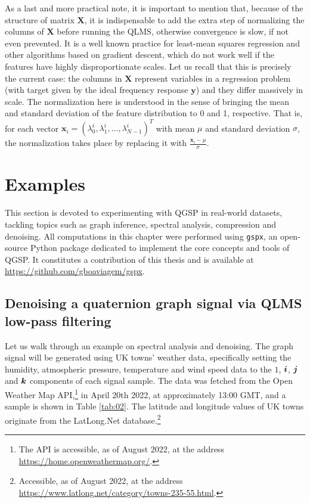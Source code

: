 As a last and more practical note, it is important to mention that, because of the structure of matrix $\mathbf{X}$, it is indispensable to add the extra step of normalizing the columns of $\mathbf{X}$ before running the QLMS, otherwise convergence is slow, if not even prevented. It is a well known practice for least-mean squares regression and other algorithms based on gradient descent, which do not work well if the features have highly disproportionate scales. Let us recall that this is precisely the current case: the columns in $\mathbf{X}$ represent variables in a regression problem (with target given by the ideal frequency response $\mathbf{y}$) and they differ massively in scale. The normalization here is understood in the sense of bringing the mean and standard deviation of the feature distribution to 0 and 1, respective. That is, for each vector $\mathbf{x}_i = (\lambda^i_0, \lambda^i_1, \dots, \lambda^i_{N-1})^T$ with mean $\mu$ and standard deviation $\sigma$, the normalization takes place by replacing it with $\frac{\mathbf{x}_i - \mu}{\sigma}$.

\section{Examples}

This section is devoted to experimenting with QGSP in real-world datasets, tackling topics such as graph inference, spectral analysis, compression and denoising. All computations in this chapter were performed using \texttt{gspx}, an open-source Python package dedicated to implement the core concepts and tools of QGSP. It constitutes a contribution of this thesis and is available at \url{https://github.com/gboaviagem/gspx}.

\subsection{Denoising a quaternion graph signal via QLMS low-pass filtering}
\label{subsec:denoising}

Let us walk through an example on spectral analysis and denoising. The graph signal will be generated using UK towns' weather data, specifically setting the humidity, atmospheric pressure, temperature and wind speed data to the $1$, $\boldsymbol{i}$, $\boldsymbol{j}$ and $\boldsymbol{k}$ components of each signal sample. The data was fetched from the Open Weather Map API,\footnote{The API is accessible, as of August 2022, at the address \url{https://home.openweathermap.org/}.} in April 20th 2022, at approximately 13:00 GMT, and a sample is shown in Table \ref{tab:02}. The latitude and longitude values of UK towns originate from the LatLong.Net database.\footnote{Accessible, as of August 2022, at the address \url{https://www.latlong.net/category/towns-235-55.html}.}

